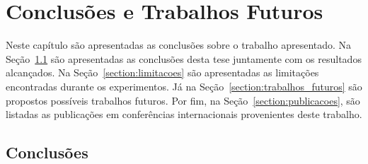 \chapter{Conclusões e Trabalhos Futuros}\label{chapter:conclusoes_futuros}
Neste capítulo são apresentadas as conclusões sobre o trabalho apresentado. Na Seção~\ref{section:conclusoes} são apresentadas as conclusões desta tese juntamente com os resultados alcançados. Na Seção~\ref{section:limitacoes} são apresentadas as limitações encontradas durante os experimentos. Já na Seção~\ref{section:trabalhos_futuros} são propostos possíveis trabalhos futuros. Por fim, na Seção~\ref{section:publicacoes}, são listadas as publicações em conferências internacionais provenientes deste trabalho.

\section{Conclusões}\label{section:conclusoes}




